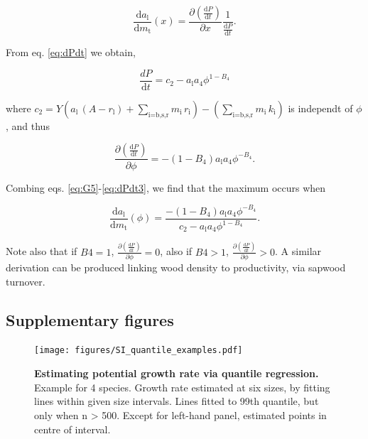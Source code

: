 \documentclass[12pt, a4paper]{article}
\begin{document}
\begin{equation} \label{eq:G5}
\frac{\textrm{d}a_\textrm{l}} {\textrm{d}m_\textrm{t}}(x) =  \frac{\partial \left( \frac{ \textrm{d}P} {\textrm{d}t}\right)}{\partial x} \frac{1}{\frac{ \textrm{d}P} {\textrm{d}t} }.
\end{equation}

From eq. \ref{eq:dPdt} we obtain,

\begin{equation}\label{eq:dPdt2}
\frac{dP}{\textrm{d}t} = c_2 - a_\textrm{l} a_4 \phi ^{1-B_4}
\end{equation}

where
\(c_2 = Y ( a_\textrm{l} \, (A - r_\textrm{l}) + \sum_\textrm{i=b,s,r}{m_\textrm{i} \, r_\textrm{i}}) - (\sum_\textrm{i=b,s,r}{m_\textrm{i} \, k_\textrm{i}})\)
is independt of \(\phi\), and thus

\begin{equation}\label{eq:dPdt3}
\frac{\partial \left( \frac{ \textrm{d}P} {\textrm{d}t}\right)}{\partial \phi}  = - (1-B_4) a_\textrm{l} a_4\phi ^{-B_4}.
\end{equation}

Combing eqs. \ref{eq:G5}-\ref{eq:dPdt3}, we find that the maximum occurs
when

\begin{equation} \label{eq:G6}
\frac{\textrm{d}a_\textrm{l}} {\textrm{d}m_\textrm{t}}(\phi) = \frac{- (1-B_4) a_\textrm{l} a_4\phi ^{-B_4}}{c_2 - a_\textrm{l} a_4 \phi ^{1-B_4}}.
\end{equation}

Note also that if \(B4=1\),
\(\frac{\partial \left( \frac{ \textrm{d}P} {\textrm{d}t}\right)}{\partial \phi} =0\),
also if \(B4>1\),
\(\frac{\partial \left( \frac{ \textrm{d}P} {\textrm{d}t}\right)}{\partial \phi} > 0\).
A similar derivation can be produced linking wood density to
productivity, via sapwood turnover.

\subsection{Supplementary figures}\label{supplementary-figures}

\begin{figure}[htbp]
\centering
\texttt{[image: figures/SI\_quantile\_examples.pdf]}
\caption{\textbf{Estimating potential growth rate via quantile
regression.} Example for 4 species. Growth rate estimated at six sizes,
by fitting lines within given size intervals. Lines fitted to 99th
quantile, but only when n \textgreater{} 500. Except for left-hand
panel, estimated points in centre of interval.
\label{fS-quantile_examples}}
\end{figure}
\end{document}
